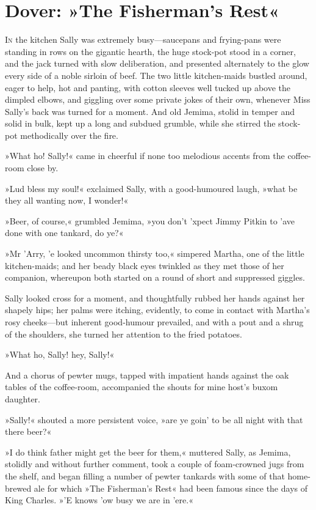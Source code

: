
\chapter{Dover: »The Fisherman's Rest«}
\lettrine[lines=4]{I}{n} the kitchen Sally was extremely busy\allowbreak---\allowbreak sauce\-pans and frying-pans were standing in rows on the gigantic hearth, the huge stock-pot stood in a corner, and the jack turned with slow deliberation, and presented alternately to the glow every side of a noble sirloin of beef. The two little kitchen-maids bustled around, eager to help, hot and panting, with cotton sleeves well tucked up above the dimpled elbows, and giggling over some private jokes of their own, whenever Miss Sally's back was turned for a moment. And old Jemima, stolid in temper and solid in bulk, kept up a long and subdued grumble, while she stirred the stock-pot methodically over the fire.

»What ho! Sally!« came in cheerful if none too melodious accents from the coffee-room close by.

»Lud bless my soul!« exclaimed Sally, with a good-humoured laugh, »what be they all wanting now, I wonder!«

»Beer, of course,« grumbled Jemima, »you don't 'xpect Jimmy Pitkin to 'ave done with one tankard, do ye?«

»Mr 'Arry, 'e looked uncommon thirsty too,« simpered Martha, one of the little kitchen-maids; and her beady black eyes twinkled as they met those of her companion, whereupon both started on a round of short and suppressed giggles.

Sally looked cross for a moment, and thoughtfully rubbed her hands against her shapely hips; her palms were itching, evidently, to come in contact with Martha's rosy cheeks\allowbreak---\allowbreak but inherent good-humour prevailed, and with a pout and a shrug of the shoulders, she turned her attention to the fried potatoes.

»What ho, Sally! hey, Sally!«

And a chorus of pewter mugs, tapped with impatient hands against the oak tables of the coffee-room, accompanied the shouts for mine host's buxom daughter.

»Sally!« shouted a more persistent voice, »are ye goin' to be all night with that there beer?«

»I do think father might get the beer for them,« muttered Sally, as Jemima, stolidly and without further comment, took a couple of foam-crowned jugs from the shelf, and began filling a number of pewter tankards with some of that home-brewed ale for which »The Fisherman's Rest« had been famous since the days of King Charles. »'E knows 'ow busy we are in 'ere.«

